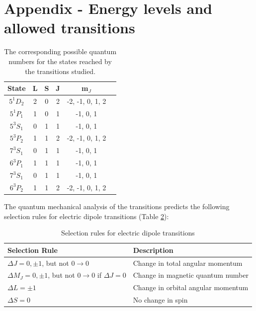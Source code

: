 \documentclass[11pt]{article}
\begin{document}
\section{Appendix - Energy levels and allowed transitions} \label{sec: theory derivation}
\begin{table}[h!]
    \centering
    \begin{tabular}{cccccc}
        \toprule
        \textbf{State} & \textbf{L} & \textbf{S} & \textbf{J} & \textbf{m$_J$} \\
        \midrule
        $5^1 D_2$ & 2 & 0 & 2 & -2, -1, 0, 1, 2 \\
        $5^1 P_1$ & 1 & 0 & 1 & -1, 0, 1 \\
        $5^3 S_1$ & 0 & 1 & 1 & -1, 0, 1 \\
        $5^3 P_2$ & 1 & 1 & 2 & -2, -1, 0, 1, 2 \\
        $7^3 S_1$ & 0 & 1 & 1 & -1, 0, 1 \\
        $6^3 P_1$ & 1 & 1 & 1 & -1, 0, 1 \\
        $7^3 S_1$ & 0 & 1 & 1 & -1, 0, 1 \\
        $6^3 P_2$ & 1 & 1 & 2 & -2, -1, 0, 1, 2 \\
        \bottomrule
    \end{tabular}
    \captionsetup{justification=centering}
    \caption{The corresponding possible quantum numbers for the states reached by the transitions studied.}
    \label{tab: quantum_numbers}
\end{table}

The quantum mechanical analysis of the transitions predicts the following selection rules for electric dipole transitions (Table \ref{tab:selection_rules}): 
\begin{table}[h!]
    \centering
    \begin{tabular}{ll}
        \toprule
        Selection Rule & Description \\
        \midrule
        $\Delta J = 0, \pm 1$, but not $0 \rightarrow 0$ & Change in total angular momentum \\
        $\Delta M_J = 0, \pm 1$, but not $0 \rightarrow 0$ if $\Delta J = 0$ & Change in magnetic quantum number \\
        $\Delta L = \pm 1$ & Change in orbital angular momentum \\
        $\Delta S = 0$ & No change in spin \\
        \bottomrule
    \end{tabular}
    \caption{Selection rules for electric dipole transitions}
    \label{tab:selection_rules}
\end{table}
\end{document}
